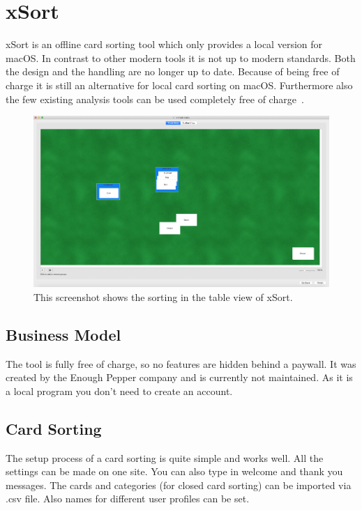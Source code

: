 \chapter{xSort}

\label{chap:tool}
xSort is an offline card sorting tool which only provides a local version for macOS. In contrast to 
other modern tools it is not up to modern standards. Both the design and the handling are no
longer up to date. Because of being free of charge it is still an alternative for local card sorting on 
macOS. Furthermore also the few existing analysis tools can be used completely free of charge~\parencite{xSort}.

\begin{figure}[tp] 
\centering
\includegraphics[keepaspectratio,width=\linewidth,height=\halfh]{images/xsort-sorting.png}
\caption[xSort Application] { This screenshot shows the sorting in the table view of xSort.
 }
\label{fig:xSort-sorting}
\end{figure}


\section{Business Model}
The tool is fully free of charge, so no features are hidden behind a paywall. It was created by the 
Enough Pepper company and is currently not maintained. As it is a local program you don't need 
to create an account.

\section{Card Sorting}
The setup process of a card sorting is quite simple and works well. All the settings can be made 
on one site. You can also type in welcome and thank you messages. The cards and categories 
(for closed card sorting) can be imported via .csv file. Also names for different user profiles can be 
set.

